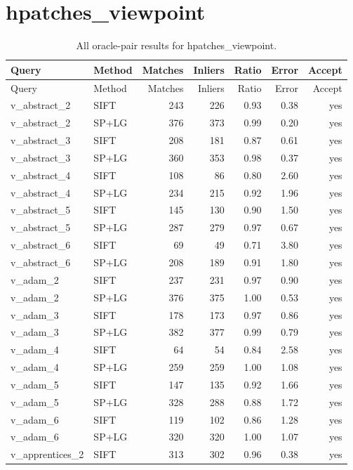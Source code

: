 \section{hpatches\_viewpoint}
\begingroup\scriptsize\setlength{\tabcolsep}{3pt}
\begin{longtable}{llrrrrr}
\caption{All oracle-pair results for hpatches\_viewpoint.}\\
\toprule
Query & Method & Matches & Inliers & Ratio & Error & Accept\\\midrule\endfirsthead
\toprule Query & Method & Matches & Inliers & Ratio & Error & Accept\\\midrule\endhead
\bottomrule\endfoot
v\_abstract\_2 & SIFT & 243 & 226 & 0.93 & 0.38 & yes \\
v\_abstract\_2 & SP+LG & 376 & 373 & 0.99 & 0.20 & yes \\
v\_abstract\_3 & SIFT & 208 & 181 & 0.87 & 0.61 & yes \\
v\_abstract\_3 & SP+LG & 360 & 353 & 0.98 & 0.37 & yes \\
v\_abstract\_4 & SIFT & 108 & 86 & 0.80 & 2.60 & yes \\
v\_abstract\_4 & SP+LG & 234 & 215 & 0.92 & 1.96 & yes \\
v\_abstract\_5 & SIFT & 145 & 130 & 0.90 & 1.50 & yes \\
v\_abstract\_5 & SP+LG & 287 & 279 & 0.97 & 0.67 & yes \\
v\_abstract\_6 & SIFT & 69 & 49 & 0.71 & 3.80 & yes \\
v\_abstract\_6 & SP+LG & 208 & 189 & 0.91 & 1.80 & yes \\
v\_adam\_2 & SIFT & 237 & 231 & 0.97 & 0.90 & yes \\
v\_adam\_2 & SP+LG & 376 & 375 & 1.00 & 0.53 & yes \\
v\_adam\_3 & SIFT & 178 & 173 & 0.97 & 0.86 & yes \\
v\_adam\_3 & SP+LG & 382 & 377 & 0.99 & 0.79 & yes \\
v\_adam\_4 & SIFT & 64 & 54 & 0.84 & 2.58 & yes \\
v\_adam\_4 & SP+LG & 259 & 259 & 1.00 & 1.08 & yes \\
v\_adam\_5 & SIFT & 147 & 135 & 0.92 & 1.66 & yes \\
v\_adam\_5 & SP+LG & 328 & 288 & 0.88 & 1.72 & yes \\
v\_adam\_6 & SIFT & 119 & 102 & 0.86 & 1.28 & yes \\
v\_adam\_6 & SP+LG & 320 & 320 & 1.00 & 1.07 & yes \\
v\_apprentices\_2 & SIFT & 313 & 302 & 0.96 & 0.38 & yes \\

\end{longtable}
